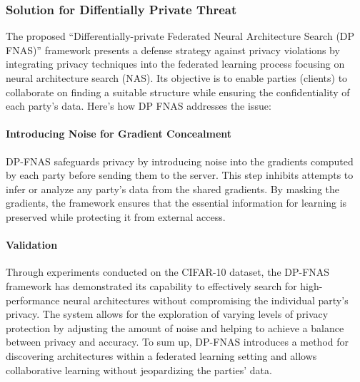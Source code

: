 \documentclass[conference]{IEEEtran}
\begin{document}
\subsubsection{\textbf{Solution for Diffentially Private Threat}}
The proposed \enquote{Differentially-private Federated Neural Architecture Search (DP FNAS)} framework presents a defense strategy against privacy violations by integrating privacy techniques into the federated learning process focusing on neural architecture search (NAS). Its objective is to enable parties (clients) to collaborate on finding a suitable structure while ensuring the confidentiality of each party's data.
Here's how DP FNAS addresses the issue: 
\paragraph{Introducing Noise for Gradient Concealment} DP-FNAS safeguards privacy by introducing noise into the gradients computed by each party before sending them to the server. This step inhibits attempts to infer or analyze any party's data from the shared gradients. By masking the gradients, the framework ensures that the essential information for learning is preserved while protecting it from external access.
\paragraph{Validation} Through experiments conducted on the CIFAR-10 dataset, the DP-FNAS framework has demonstrated its capability to effectively search for high-performance neural architectures without compromising the individual party’s privacy. The system allows for the exploration of varying levels of privacy protection by adjusting the amount of noise and helping to achieve a balance between privacy and accuracy.
To sum up, DP-FNAS introduces a method for discovering architectures within a federated learning setting and allows collaborative learning without jeopardizing the parties' data.
\end{document}
